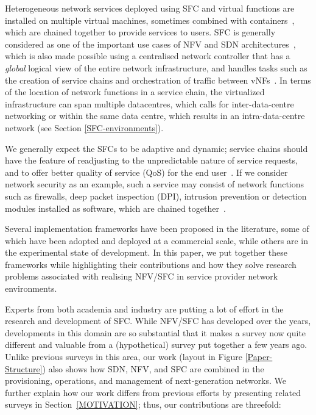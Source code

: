 \documentclass[futureinternet,review,accept,pdftex,moreauthors]{Definitions/mdpi}
\begin{document}
Heterogeneous network services deployed using SFC and virtual functions are installed on multiple virtual machines, sometimes combined with containers~\cite{bujari2019service, santos2020towards}, which are chained together to provide services to users. SFC is generally considered as one of the important use cases of NFV and SDN architectures~\cite{li2016survey}, which is also made possible using a centralised network controller that has a \textit{global} logical view of the entire network infrastructure, and handles tasks such as the creation of service chains and orchestration of traffic between vNFs~\cite{haleplidis2014forces}. In terms of the location of network functions in a service chain, the virtualized infrastructure can span multiple datacentres, which calls for inter-data-centre networking or within the same data centre, which results in an intra-data-centre network (see Section \ref{SFC-environments}).

We generally expect the SFCs to be adaptive and dynamic; service chains should have the feature of readjusting to the unpredictable nature of service requests, and to offer better quality of service (QoS) for the end user~\cite{liu2017dynamic, chua2016stringer}. If we consider network security as an example, such a service may consist of network functions such as firewalls, deep packet inspection (DPI), intrusion prevention or detection modules installed as software, which are chained together~\cite{bhamare2017optimal}.

Several implementation frameworks have been proposed in the literature, some of which have been adopted and deployed at a commercial scale, while others are in the experimental state of development. In this paper, we put together these frameworks while highlighting their contributions and how they solve research problems associated with realising NFV/SFC in service provider network environments. 

Experts from both academia and industry are putting a lot of effort in the research and development of SFC. While NFV/SFC has developed over the years, developments in this domain are so substantial that it makes a survey now quite different and valuable from a (hypothetical) survey put together a few years ago. Unlike previous surveys in this area, our work (layout in Figure \ref{Paper-Structure}) also shows how SDN, NFV, and SFC are combined in the provisioning, operations, and management of next-generation networks. We further explain how our work differs from previous efforts by presenting related surveys in Section~\ref{MOTIVATION}; thus, our contributions are threefold:
\end{document}
